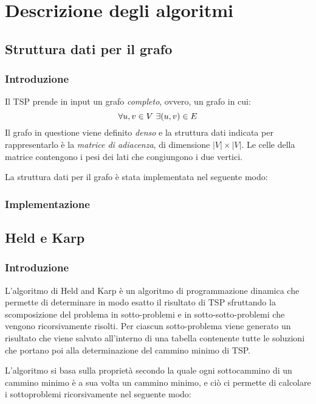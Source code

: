 \section{Descrizione degli algoritmi}

\subsection{Struttura dati per il grafo}

\subsubsection{Introduzione}

Il TSP prende in input un grafo \textit{completo}, ovvero, un grafo in cui:
\[
    \forall u, v \in V \textnormal{ } \exists (u, v) \in E
\]
Il grafo in questione viene definito \textit{denso} e la struttura dati indicata per rappresentarlo è
la \textit{matrice di adiacenza}, di dimensione $|V| \times |V|$. Le celle della matrice contengono
i pesi dei lati che congiungono i due vertici.

La struttura dati per il grafo è stata implementata nel seguente
modo:

\subsubsection{Implementazione}

\subsection{Held e Karp}

\subsubsection{Introduzione}

L'algoritmo di Held and Karp è un algoritmo di programmazione dinamica che permette di determinare in modo esatto il risultato di TSP sfruttando la scomposizione del problema in sotto-problemi e in sotto-sotto-problemi che vengono ricorsivamente risolti. Per ciascun sotto-problema viene generato un risultato che viene salvato all'interno di una tabella contenente tutte le soluzioni che portano poi alla determinazione del cammino minimo di TSP.

L'algoritmo si basa sulla proprietà secondo la quale ogni sottocammino di un cammino minimo è a sua volta un cammino minimo, e ciò ci permette di calcolare i sottoproblemi ricorsivamente nel seguente modo: 

